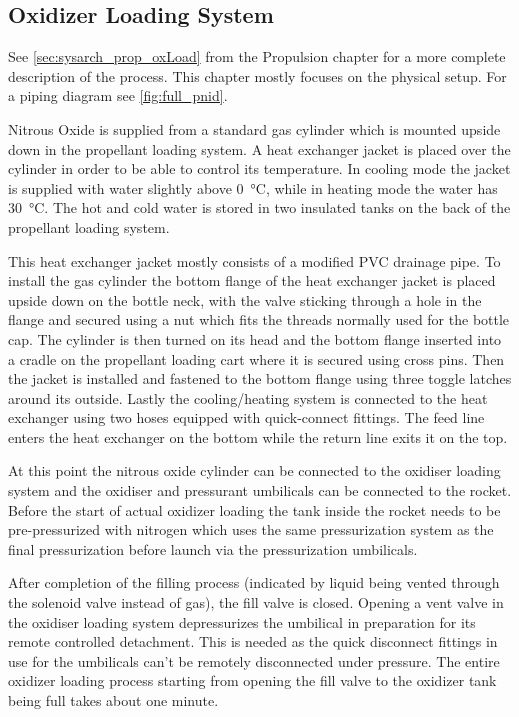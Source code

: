 \subsection{Oxidizer Loading System}
\label{sec:groundsys_oxload}

See \cref{sec:sysarch_prop_oxLoad} from the Propulsion chapter for a more complete description of the process. This chapter mostly focuses on the physical setup. For a piping diagram see \cref{fig:full_pnid}.

Nitrous Oxide is supplied from a standard gas cylinder which is mounted upside down in the propellant loading system. A heat exchanger jacket is placed over the cylinder in order to be able to control its temperature. In cooling mode the jacket is supplied with water slightly above \SI{0}{\celsius}, while in heating mode the water has \SI{30}{\celsius}.
The hot and cold water is stored in two insulated tanks on the back of the propellant loading system.

This heat exchanger jacket mostly consists of a modified PVC drainage pipe.
To install the gas cylinder the bottom flange of the heat exchanger jacket is placed upside down on the bottle neck, with the valve sticking through a hole in the flange and secured using a nut which fits the threads normally used for the bottle cap. The cylinder is then turned on its head and the bottom flange inserted into a cradle on the propellant loading cart where it is secured using cross pins. Then the jacket is installed and fastened to the bottom flange using three toggle latches around its outside. Lastly the cooling/heating system is connected to the heat exchanger using two hoses equipped with quick-connect fittings. The feed line enters the heat exchanger on the bottom while the return line exits it on the top.

At this point the nitrous oxide cylinder can be connected to the oxidiser loading system and the oxidiser and pressurant umbilicals can be connected to the rocket. Before the start of actual oxidizer loading the tank inside the rocket needs to be pre-pressurized with nitrogen which uses the same pressurization system as the final pressurization before launch via the pressurization umbilicals.

After completion of the filling process (indicated by liquid being vented through the solenoid valve instead of gas), the fill valve is closed. Opening a vent valve in the oxidiser loading system depressurizes the umbilical in preparation for its remote controlled detachment. This is needed as the quick disconnect fittings in use for the umbilicals can't be remotely disconnected under pressure. The entire oxidizer loading process starting from opening the fill valve to the oxidizer tank being full takes about one minute.

